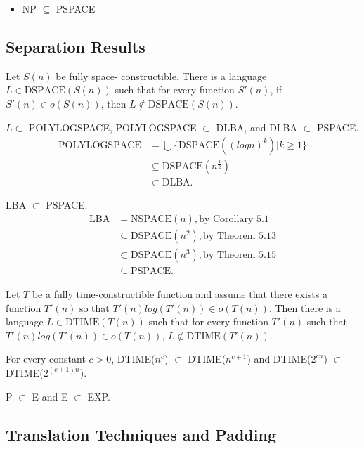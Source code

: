 \begin{itemize}
  \item NP $\subseteq$ PSPACE
\end{itemize}


\subsection{Separation Results}

 Let $S(n)$ be fully space-
constructible. There is a language $L \in \text{DSPACE}(S(n))$ such that for every function
$S'(n)$, if $S'(n) \in o(S(n))$, then $L \notin \text{DSPACE}(S(n))$.

 $L \subset$ POLYLOGSPACE, POLYLOGSPACE $\subset$ DLBA, and DLBA
$\subset$ PSPACE.
\begin{align*}
\text{POLYLOGSPACE} &= \bigcup \{\text{DSPACE}((logn)^k ) | k \ge 1\}\\
&\subseteq \text{DSPACE}(n^\frac{1}{2})\\
&\subset \text{DLBA}.
\end{align*}

 LBA $\subset$ PSPACE.
\begin{align*}
\text{LBA} &= \text{NSPACE}(n), \text{by Corollary 5.1} \\
& \subseteq \text{DSPACE}(n^2 ), \text{by Theorem 5.13} \\
& \subset \text{DSPACE}(n^3 ), \text{by Theorem 5.15} \\
& \subseteq \text{PSPACE}.
\end{align*}

 Let $T$ be a fully time-constructible
function and assume that there exists a function $T'(n)$ so that
$T'(n)log(T'(n)) \in o(T(n))$.
Then there is a language $L \in \text{DTIME}(T(n))$ such that for every function 
$T'(n)$ such that $T'(n)log(T'(n)) \in o(T(n))$, $L \notin \text{DTIME}(T'(n))$.

 For every constant $c > 0$, DTIME($n^c$) $\subset$ DTIME($n^{c+1}$) and
DTIME($2^{cn}$) $\subset$ DTIME($2^{(c+1)n}$).

 P $\subset$ E and E $\subset$ EXP.

\subsection{Translation Techniques and Padding}

